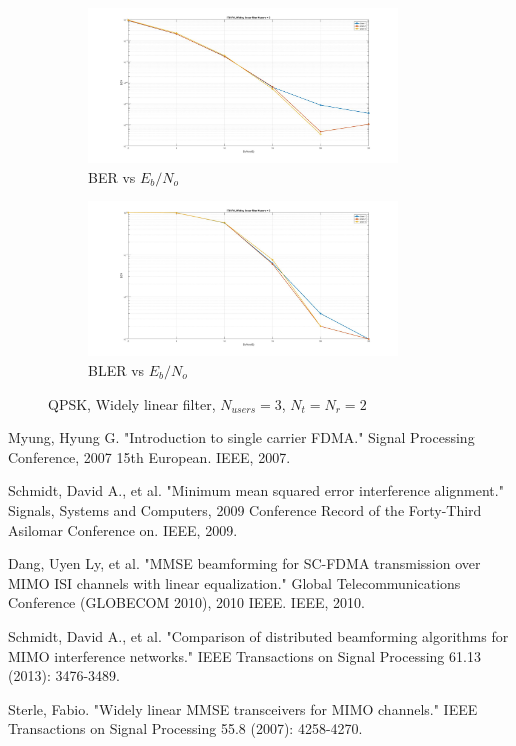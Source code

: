 \documentclass[12pt,a4paper,notitlepage,twoside,headsepline]{scrartcl}
\begin{document}
\begin{figure}
\centering
\begin{subfigure}{.5\textwidth}
  \centering
  \includegraphics[width=0.9\textwidth]{figures/Wl_nu3_ber}
  \caption{BER vs $E_b/N_o$} 
  \label{fig:example}
\end{subfigure}%
\begin{subfigure}{.5\textwidth}
  \centering
  \includegraphics[width=0.9\textwidth]{figures/Wl_nu3_bler}
  \caption{BLER vs $E_b/N_o$}
  \label{fig:example}
\end{subfigure}
\caption{QPSK, Widely linear filter, $N_{users} = 3$, $N_t = N_r = 2$}
\label{fig:test}
\end{figure}


\begin{thebibliography}{Kop96}
Myung, Hyung G. "Introduction to single carrier FDMA." Signal Processing Conference, 2007 15th European. IEEE, 2007.


Schmidt, David A., et al. "Minimum mean squared error interference alignment." Signals, Systems and Computers, 2009 Conference Record of the Forty-Third Asilomar Conference on. IEEE, 2009.

Dang, Uyen Ly, et al. "MMSE beamforming for SC-FDMA transmission over MIMO ISI channels with linear equalization." Global Telecommunications Conference (GLOBECOM 2010), 2010 IEEE. IEEE, 2010.	

Schmidt, David A., et al. "Comparison of distributed beamforming algorithms for MIMO interference networks." IEEE Transactions on Signal Processing 61.13 (2013): 3476-3489.

Sterle, Fabio. "Widely linear MMSE transceivers for MIMO channels." IEEE Transactions on Signal Processing 55.8 (2007): 4258-4270.



\end{thebibliography}



\end{document}
